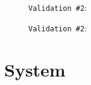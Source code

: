 \documentclass[12pt]{article}
\begin{document}
\begin{figure}
\centering
\noindent{}
  \caption{\centering \texttt{Validation \#2}: \hspace{\textwidth}}
  \label{fig:pmt1}
\end{figure}

\begin{figure}
\centering
\noindent{}
  \caption{\centering \texttt{Validation \#2}: \hspace{\textwidth}}
  \label{fig:pmt2}
\end{figure}

\clearpage

\section{System}
\end{document}
